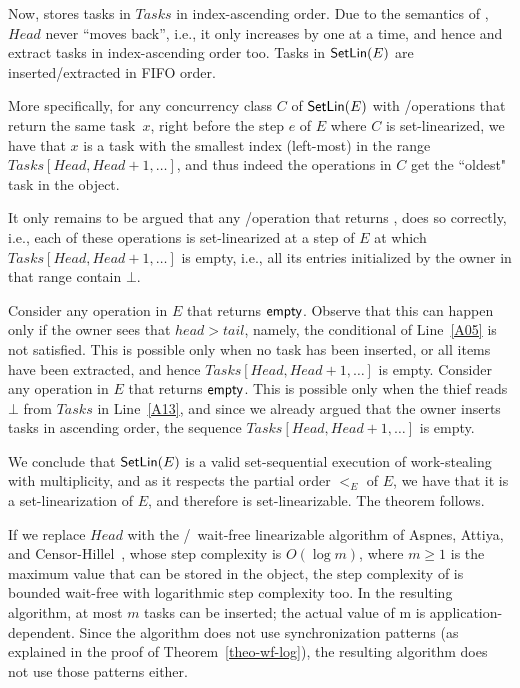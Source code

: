 \begin{proofT}
Now, \Put stores tasks in \(Tasks\) in index-ascending order. Due to the semantics of \MaxReg, \(Head\) never ``moves back'', i.e., it only increases by one at a time, and hence \Take and \Steal extract tasks in index-ascending order too. Tasks in \({\sf SetLin}(E)\) are inserted/extracted in FIFO order.

More specifically, for any concurrency class \(C\) of \({\sf SetLin}(E)\) with \Take/\Steal operations that return the same task~\(x\), right before the step \(e\) of \(E\) where \(C\) is set-linearized, we have that \(x\) is a task with the smallest index (left-most) in the range \(Tasks[Head, Head+1, \hdots]\), and thus indeed the operations in \(C\) get the ``oldest" task in the object.

It only remains to be argued that any \Take/\Steal operation that returns \epty, does so correctly, i.e., each of these operations is set-linearized at a step of \(E\) at which \(Tasks[Head, Head+1, \hdots]\) is empty, i.e., all its entries initialized by the owner in that range contain \(\bot\).

Consider any \Take operation in \(E\) that returns \({\sf empty}\).  Observe that this can happen only if the owner sees that \(head > tail\), namely, the conditional of Line~\ref{A05} is not satisfied. This is possible only when no task has been inserted, or all items have been extracted, and hence \(Tasks[Head, Head+1, \hdots]\) is empty. Consider any \Steal operation in \(E\) that returns \({\sf empty}\).  This is possible only when the thief reads \(\bot\) from \(Tasks\) in Line~\ref{A13}, and since we already argued that the owner inserts tasks in ascending order, the sequence \(Tasks[Head, Head+1, \hdots]\) is empty.

We conclude that \({\sf SetLin}(E)\) is a valid set-sequential execution of work-stealing with multiplicity, and as it respects the partial order \(<_E\) of \(E\), we have that it is a set-linearization of \(E\), and therefore \WFWSM is set-linearizable. The theorem follows.
\end{proofT}

If we replace \(Head\) with the \R/\W\ wait-free linearizable \MaxReg algorithm of Aspnes, Attiya, and Censor-Hillel~\cite{DBLP_journals_jacm_AspnesAC12}, whose step complexity is \(O(\log m)\), where \(m \ge 1\) is the maximum value that can be stored in the object, the step complexity of \WFWSM is bounded wait-free with logarithmic step complexity too. In the resulting algorithm, at most $m$ tasks can be inserted; the actual value of m is application-dependent. Since the algorithm does not use \RAW synchronization patterns (as explained in the proof of Theorem~\ref{theo-wf-log}), the resulting algorithm does not use those patterns either.

